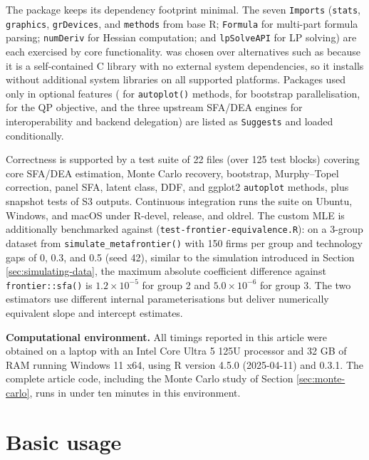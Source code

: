 The package keeps its dependency footprint minimal. The seven \texttt{Imports}
(\texttt{stats}, \texttt{graphics}, \texttt{grDevices}, and \texttt{methods} from base \textsf{R};
\texttt{Formula} for multi-part formula parsing; \texttt{numDeriv} for Hessian
computation; and \texttt{lpSolveAPI} for LP solving) are each exercised by core
functionality.  was chosen over alternatives such as
 because it is a self-contained C library with no external
system dependencies, so it installs without additional system libraries
on all supported platforms. Packages used
only in optional features ( for \texttt{autoplot()} methods,
 for bootstrap parallelisation,  for the QP
objective, and the three upstream SFA/DEA engines for interoperability and
backend delegation) are listed as \texttt{Suggests} and loaded conditionally.

Correctness is supported by a test suite of 22  files
(over 125 test blocks) covering core SFA/DEA estimation, Monte Carlo
recovery, bootstrap, Murphy--Topel correction, panel SFA, latent class,
DDF, and ggplot2 \texttt{autoplot} methods, plus snapshot tests of S3
outputs. Continuous integration runs the suite on Ubuntu, Windows, and
macOS under R-devel, release, and oldrel. The custom MLE is
additionally benchmarked against 
(\texttt{test-frontier-equivalence.R}): on a 3-group dataset from
\texttt{simulate\_metafrontier()} with 150 firms per group and technology gaps of
0, 0.3, and 0.5 (seed 42), similar to the simulation introduced in
Section \ref{sec:simulating-data}, the maximum absolute coefficient difference against
\texttt{frontier::sfa()} is \(1.2 \times 10^{-5}\) for group 2 and
\(5.0 \times 10^{-6}\) for group 3. The two estimators use different
internal parameterisations but deliver numerically equivalent slope and
intercept estimates.

\textbf{Computational environment.} All timings reported in this article were
obtained on a laptop with an Intel Core Ultra 5 125U processor and 32 GB
of RAM running Windows 11 x64, using R version 4.5.0 (2025-04-11) and
 0.3.1.
The complete article code, including the Monte Carlo study of Section \ref{sec:monte-carlo},
runs in under ten minutes in this environment.

\section{Basic usage}\label{sec:basic-usage}

